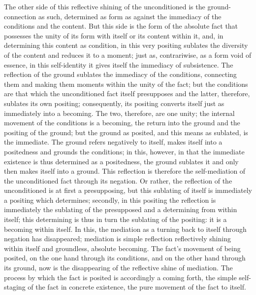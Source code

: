 The other side of this reflective shining of
the unconditioned is the ground-connection as such,
determined as form as against the immediacy
of the conditions and the content.
But this side is the form of the absolute fact
that possesses the unity of its form with itself
or its content within it,
and, in determining this content as condition,
in this very positing sublates the diversity of the content
and reduces it to a moment;
just as, contrariwise, as a form void of essence,
in this self-identity it gives itself the immediacy of subsistence.
The reflection of the ground sublates the immediacy of the conditions,
connecting them and making them moments within the unity of the fact;
but the conditions are that which the unconditioned fact itself presupposes
and the latter, therefore, sublates its own positing;
consequently, its positing converts itself
just as immediately into a becoming.
The two, therefore, are one unity;
the internal movement of the conditions is a becoming,
the return into the ground and the positing of the ground;
but the ground as posited, and this means as sublated, is the immediate.
The ground refers negatively to itself,
makes itself into a positedness and grounds the conditions;
in this, however, in that the immediate existence is
thus determined as a positedness,
the ground sublates it and only then makes itself into a ground.
This reflection is therefore the self-mediation of
the unconditioned fact through its negation.
Or rather, the reflection of the unconditioned is at first a presupposing,
but this sublating of itself is immediately a positing which determines;
secondly, in this positing the reflection is immediately
the sublating of the presupposed
and a determining from within itself;
this determining is thus in turn the sublating of the positing:
it is a becoming within itself.
In this, the mediation as a turning back
to itself through negation has disappeared;
mediation is simple reflection
reflectively shining within itself
and groundless, absolute becoming.
The fact's movement of being posited,
on the one hand through its conditions,
and on the other hand through its ground,
now is the disappearing of the reflective shine of mediation.
The process by which the fact is posited is accordingly a coming forth,
the simple self-staging of the fact in concrete existence,
the pure movement of the fact to itself.

